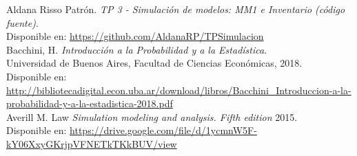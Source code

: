 \documentclass{article}
\begin{document}
  
\begin{thebibliography}{2}

Aldana Risso Patrón. \textit{TP 3 - Simulación de modelos: MM1 e Inventario (código fuente)}.\\
Disponible en: \url{https://github.com/AldanaRP/TPSimulacion} \\

Bacchini, H. \textit{Introducción a la Probabilidad y a la Estadística}.\\
Universidad de Buenos Aires, Facultad de Ciencias Económicas, 2018.\\
Disponible en: \url{http://bibliotecadigital.econ.uba.ar/download/libros/Bacchini_Introduccion-a-la-probabilidad-y-a-la-estadistica-2018.pdf}\\

Averill M. Law \textit{Simulation modeling and analysis. Fifth edition }2015. \\
Disponible en:
\url{https://drive.google.com/file/d/1ycmnW5F-kY06XxyGKrjpVFNETkTKkBUV/view}

\end{thebibliography}
\end{document}

